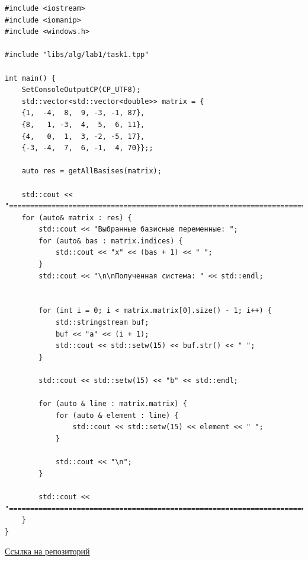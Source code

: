 \documentclass[a4paper,14pt]{extarticle}
\begin{document}
\begin{verbatim}
#include <iostream>
#include <iomanip>
#include <windows.h>

#include "libs/alg/lab1/task1.tpp"

int main() {
    SetConsoleOutputCP(CP_UTF8);
    std::vector<std::vector<double>> matrix = {
    {1,  -4,  8,  9, -3, -1, 87},
    {8,   1, -3,  4,  5,  6, 11},
    {4,   0,  1,  3, -2, -5, 17},
    {-3, -4,  7,  6, -1,  4, 70}};;

    auto res = getAllBasises(matrix);

    std::cout << "==================================================================================================================\n";
    for (auto& matrix : res) {
        std::cout << "Выбранные базисные переменные: ";
        for (auto& bas : matrix.indices) {
            std::cout << "x" << (bas + 1) << " ";
        }
        std::cout << "\n\nПолученная система: " << std::endl;


        for (int i = 0; i < matrix.matrix[0].size() - 1; i++) {
            std::stringstream buf;
            buf << "a" << (i + 1);
            std::cout << std::setw(15) << buf.str() << " ";
        }

        std::cout << std::setw(15) << "b" << std::endl;

        for (auto & line : matrix.matrix) {
            for (auto & element : line) {
                std::cout << std::setw(15) << element << " ";
            }

            std::cout << "\n";
        }
        
        std::cout << "==================================================================================================================\n";
    }
}
    \end{verbatim}
\href{https://github.com/IAmProgrammist/operations_research/blob/master/src/main.cpp}{Ссылка на репозиторий}\bigbreak
\end{document}
